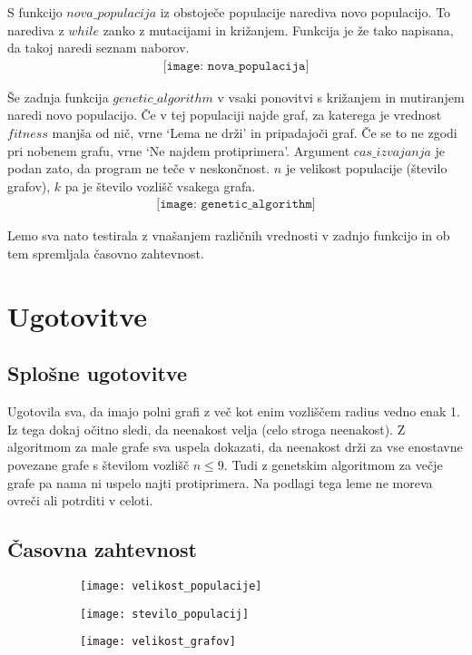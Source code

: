 \documentclass[a4paper, 10pt]{article}
\begin{document}
S funkcijo $nova\_populacija$ iz obstoječe populacije narediva novo populacijo. To narediva z $while$ zanko z mutacijami in križanjem. Funkcija je že tako napisana, da takoj naredi seznam naborov.
\begin{align*}
\texttt{[image: nova\_populacija]}
\end{align*}

Še zadnja funkcija $genetic\_algorithm$ v vsaki ponovitvi s križanjem in mutiranjem naredi novo populacijo. Če v tej populaciji najde graf, za katerega je vrednost $fitness$ manjša od nič, vrne `Lema ne drži' in pripadajoči graf. Če se to ne zgodi pri nobenem grafu, vrne `Ne najdem protiprimera'. Argument $cas\_izvajanja$ je podan zato, da program ne teče v neskončnost. $n$ je velikost populacije (število grafov), $k$ pa je število vozlišč vsakega grafa.
\begin{align*}
\texttt{[image: genetic\_algorithm]}
\end{align*}

Lemo sva nato testirala z vnašanjem različnih vrednosti v zadnjo funkcijo in ob tem spremljala časovno zahtevnost.

\section{Ugotovitve}
\subsection{Splošne ugotovitve}
Ugotovila sva, da imajo polni grafi z več kot enim vozliščem radius vedno enak 1. Iz tega dokaj očitno sledi, da neenakost velja (celo stroga neenakost).
Z algoritmom za male grafe sva uspela dokazati, da neenakost drži za vse enostavne povezane grafe s številom vozlišč  $n \leq 9$.
Tudi z genetskim algoritmom za večje grafe pa nama ni uspelo najti protiprimera.
Na podlagi tega leme ne moreva ovreči ali potrditi v celoti.

\subsection{Časovna zahtevnost}

\begin{figure}[H]
\begin{subfigure}{38mm}
\centering
\texttt{[image: velikost\_populacije]}
\end{subfigure}
\begin{subfigure}{38mm}
\centering
\texttt{[image: stevilo\_populacij]}
\end{subfigure}
\begin{subfigure}{38mm}
\centering
\texttt{[image: velikost\_grafov]}
\end{subfigure}
\end{figure}
\end{document}
